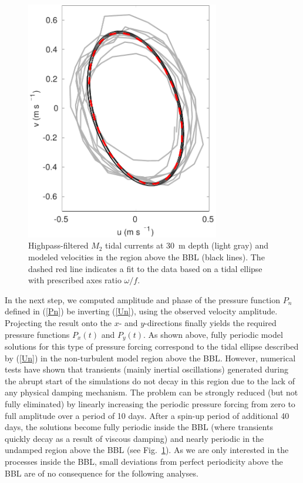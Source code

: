 \begin{figure}
  \noindent\includegraphics[width=20pc]{fitellipse.pdf}
  \caption{Highpass-filtered $M_2$ tidal currents at 30~m depth (light
    gray) and modeled velocities in the region above the BBL (black
    lines). The dashed red line indicates a fit to the data based on a
    tidal ellipse with prescribed axes ratio $\omega \slash f$.}
  \label{fitellipse}
\end{figure}

In the next step, we computed amplitude and phase of the pressure
function $P_n$ defined in (\ref{Pn}) be inverting (\ref{Un}), using
the observed velocity amplitude. Projecting the result onto the $x$-
and $y$-directions finally yields the required pressure functions
$P_x(t)$ and $P_y(t)$. As shown above, fully periodic model solutions
for this type of pressure forcing correspond to the tidal ellipse
described by (\ref{Un}) in the non-turbulent model region above the
BBL. However, numerical tests have shown that transients (mainly
inertial oscillations) generated during the abrupt start of the
simulations do not decay in this region due to the lack of any
physical damping mechanism. The problem can be strongly reduced (but
not fully eliminated) by linearly increasing the periodic pressure
forcing from zero to full amplitude over a period of 10 days. After a
spin-up period of additional 40 days, the solutions become fully
periodic inside the BBL (where transients quickly decay as a result of
viscous damping) and nearly periodic in the undamped region above the
BBL (see Fig.\ \ref{fitellipse}). As we are only interested in the
processes inside the BBL, small deviations from perfect periodicity
above the BBL are of no consequence for the following analyses.

